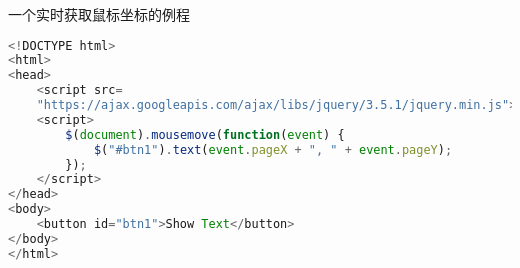一个实时获取鼠标坐标的例程
\begin{lstlisting}[language=js]
<!DOCTYPE html>
<html>
<head>
	<script src=
	"https://ajax.googleapis.com/ajax/libs/jquery/3.5.1/jquery.min.js"></script>
	<script>
		$(document).mousemove(function(event) {
			$("#btn1").text(event.pageX + ", " + event.pageY);
		});
	</script>
</head>
<body>
	<button id="btn1">Show Text</button>
</body>
</html>
\end{lstlisting}

